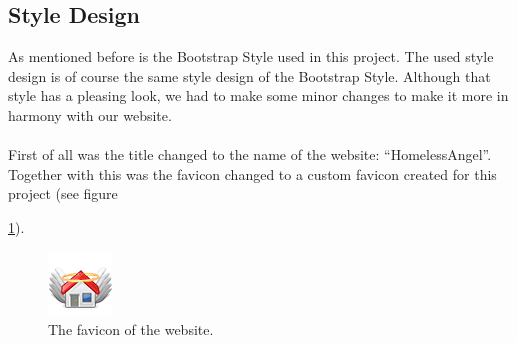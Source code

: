\documentclass[a4paper]{report}
\begin{document}
\clearpage

\subsection{Style Design}
As mentioned before is the Bootstrap Style used in this project. The used style design is of course the same style design of the Bootstrap Style. Although that style has a pleasing look, we had to make some minor changes to make it more in harmony with our website.
\\\\
First of all was the title changed to the name of the website: ``HomelessAngel''. Together with this was the favicon changed to a custom favicon created for this project (see figure {\ref{fig:favicon}).
\begin{figure}[h]
    \centering
    \includegraphics[width=.1\textwidth]{favicon}
    \caption{The favicon of the website.}
    \label{fig:favicon}
\end{figure}

}
\end{document}
